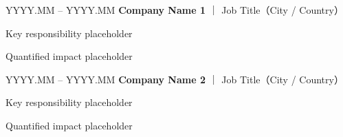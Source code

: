
\begin{twocolentry}{YYYY.MM -- YYYY.MM}
  \textbf{Company Name 1} ｜ Job Title（City / Country）
\end{twocolentry}

\begin{onecolentry}
  \begin{highlights}
    \item Key responsibility placeholder
    \item Quantified impact placeholder
  \end{highlights}
\end{onecolentry}

\vspace{0.20 cm} 

\begin{twocolentry}{YYYY.MM -- YYYY.MM}
  \textbf{Company Name 2} ｜ Job Title（City / Country）
\end{twocolentry}

\begin{onecolentry}
  \begin{highlights}
    \item Key responsibility placeholder
    \item Quantified impact placeholder
  \end{highlights}
\end{onecolentry}